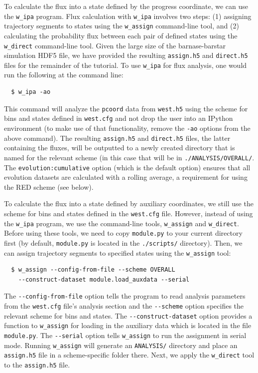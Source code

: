 \pagebreak

To calculate the flux into a state defined by the progress coordinate, we can use the \verb|w_ipa| program. Flux calculation with \verb|w_ipa| involves two steps: (1) assigning trajectory segments to states using the \verb|w_assign| command-line tool, and (2) calculating the probability flux between each pair of defined states using the \verb|w_direct| command-line tool.
Given the large size of the barnase-barstar simulation HDF5 file, we have provided the resulting \verb|assign.h5| and \verb|direct.h5| files for the remainder of the tutorial.
To use \verb|w_ipa| for flux analysis, one would run the following at the command line:  

\begin{verbatim}
  $ w_ipa -ao
\end{verbatim}

This command will analyze the \verb|pcoord| data from \verb|west.h5| using the scheme for bins and states defined in \verb|west.cfg| and not drop the user into an IPython environment (to make use of that functionality, remove the \verb|-ao| options from the above command).
The resulting \verb|assign.h5| and \verb|direct.h5| files, the latter containing the fluxes, will be outputted to a newly created directory that is named for the relevant scheme (in this case that will be in \verb|./ANALYSIS/OVERALL/|.
The \verb|evolution:cumulative| option (which is the default option) ensures that all evolution datasets are calculated with a rolling average, a requirement for using the RED scheme (see below). 

To calculate the flux into a state defined by auxiliary coordinates, we still use the scheme for bins and states defined in the \verb|west.cfg| file.
However, instead of using the \verb|w_ipa| program, we use the command-line tools, \verb|w_assign| and \verb|w_direct|.
Before using these tools, we need to copy \verb|module.py| to your current directory first (by default, \verb|module.py| is located in the \verb|./scripts/| directory).
Then, we can assign trajectory segments to specified states using the \verb|w_assign| tool:

\begin{verbatim}
  $ w_assign --config-from-file --scheme OVERALL 
    --construct-dataset module.load_auxdata --serial
\end{verbatim}

The \verb|--config-from-file| option tells the program to read analysis parameters from the \verb|west.cfg| file’s analysis section and the \verb|--scheme| option specifies the relevant scheme for bins and states.
The \verb|--construct-dataset| option provides a function to \verb|w_assign| for loading in the auxiliary data which is located in the file \verb|module.py|.
The \verb|--serial| option tells \verb|w_assign| to run the assignment in serial mode.
Running \verb|w_assign| will generate an \verb|ANALYSIS/| directory and place an \verb|assign.h5| file in a scheme-specific folder there.
Next, we apply the \verb|w_direct| tool to the \verb|assign.h5| file.

